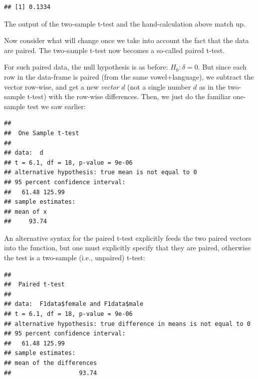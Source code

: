 \documentclass[12pt,]{krantz}
\newenvironment{Shaded}{\begin{snugshade}}{\end{snugshade}}
\newcommand{\DataTypeTok}[1]{\textcolor[rgb]{0.13,0.29,0.53}{#1}}
\newcommand{\KeywordTok}[1]{\textcolor[rgb]{0.13,0.29,0.53}{\textbf{#1}}}
\newcommand{\NormalTok}[1]{#1}
\newcommand{\OperatorTok}[1]{\textcolor[rgb]{0.81,0.36,0.00}{\textbf{#1}}}
\newcommand{\OtherTok}[1]{\textcolor[rgb]{0.56,0.35,0.01}{#1}}
\begin{document}
\begin{verbatim}
## [1] 0.1334
\end{verbatim}

The output of the two-sample t-test and the hand-calculation above match up.

Now consider what will change once we take into account the fact that the data are paired. The two-sample t-test now becomes a so-called paired t-test.

For such paired data, the null hypothesis is as before: \(H_0: \delta=0\). But since each row in the data-frame is paired (from the same vowel+language), we subtract the vector row-wise, and get a new \emph{vector} \(d\) (not a single number \(d\) as in the two-sample t-test) with the row-wise differences. Then, we just do the familiar one-sample test we saw earlier:

\begin{Shaded}
\end{Shaded}

\begin{verbatim}
## 
##  One Sample t-test
## 
## data:  d
## t = 6.1, df = 18, p-value = 9e-06
## alternative hypothesis: true mean is not equal to 0
## 95 percent confidence interval:
##   61.48 125.99
## sample estimates:
## mean of x 
##     93.74
\end{verbatim}

An alternative syntax for the paired t-test explicitly feeds the two paired vectors into the function, but one must explicitly specify that they are paired, otherwise the test is a two-sample (i.e., unpaired) t-test:

\begin{Shaded}
\end{Shaded}

\begin{verbatim}
## 
##  Paired t-test
## 
## data:  F1data$female and F1data$male
## t = 6.1, df = 18, p-value = 9e-06
## alternative hypothesis: true difference in means is not equal to 0
## 95 percent confidence interval:
##   61.48 125.99
## sample estimates:
## mean of the differences 
##                   93.74
\end{verbatim}
\end{document}
